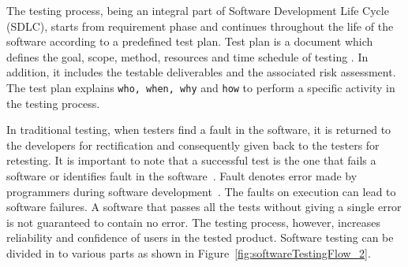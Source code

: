 The testing process, being an integral part of Software Development Life Cycle (SDLC), starts from requirement phase and continues throughout the life of the software according to a predefined test plan. Test plan is a document which defines the goal, scope, method, resources and time schedule of testing \cite{futrell2001quality}. In addition, it includes the testable deliverables and the associated risk assessment. The test plan explains \verb+who, when, why+ and \verb+how+ to perform a specific activity in the testing process. 

In traditional testing, when testers find a fault in the software, it is returned to the developers for rectification and consequently given back to the testers for retesting. It is important to note that a successful test is the one that fails a software or identifies fault in the software~\cite{myers2011art}. Fault denotes error made by programmers during software development~\cite{american1984}. The faults on execution can lead to software failures. A software that passes all the tests without giving a single error is not guaranteed to contain no error. The testing process, however, increases reliability and confidence of users in the tested product. Software testing can be divided in to various parts as shown in Figure~\ref{fig:softwareTestingFlow_2}.


